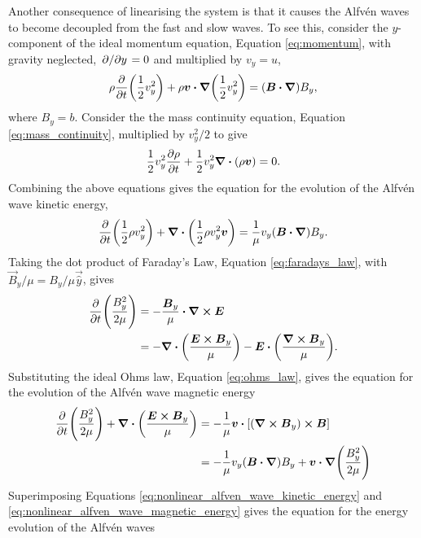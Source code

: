 Another consequence of linearising the system is that it causes the Alfv\'en waves to become decoupled from the fast and slow waves. To see this, consider the $y$-component of the ideal momentum equation, Equation \eqref{eq:momentum}, with gravity neglected, $\pdv*{}{y}=0$ and multiplied by $v_y=u$,
\begin{equation}
    \rho\pdv{}{t}\qty(\frac{1}{2}v_y^2)+\rho\vec{v}\vdot\grad\qty(\frac{1}{2}v_y^2)=(\vec{B}\vdot\grad)B_y,
\end{equation}
where $B_y=b$.
Consider the the mass continuity equation, Equation \eqref{eq:mass_continuity}, multiplied by $v_y^2/2$ to give 
\begin{equation}
    \frac{1}{2}v_y^2\pdv{\rho}{t}+\frac{1}{2}v_y^2\div(\rho\boldsymbol{v})=0.
\end{equation}
Combining the above equations gives the equation for the evolution of the Alfv\'en wave kinetic energy,
\begin{equation}
    \label{eq:nonlinear_alfven_wave_kinetic_energy}
    \pdv{}{t}\qty(\frac{1}{2}\rho v_y^2) + \div(\frac{1}{2}\rho v_y^2\vec{v})=\frac{1}{\mu}v_y(\vec{B}\vdot\grad)B_y.
\end{equation}
Taking the dot product of Faraday's Law, Equation \eqref{eq:faradays_law}, with $\vec{B}_y/\mu=B_y/\mu\vec{\hat{y}}$, gives
\begin{equation}
    \begin{aligned}
    \pdv{}{t}\qty(\frac{B_y^2}{2\mu})&=-\frac{\vec{B}_y}{\mu}\vdot\curl{\vec{E}} \\
    &=-\div(\frac{\vec{E}\cross\vec{B}_y}{\mu})-\vec{E}\vdot\qty(\frac{\curl{\vec{B}_y}}{\mu}).
    \end{aligned}
\end{equation}
Substituting the ideal Ohms law, Equation \eqref{eq:ohms_law}, gives the equation for the evolution of the Alfv\'en wave magnetic energy
\begin{equation}
    \label{eq:nonlinear_alfven_wave_magnetic_energy}
    \begin{aligned}
     \pdv{}{t}\qty(\frac{B_y^2}{2\mu}) + \div(\frac{\vec{E}\cross\vec{B}_y}{\mu}) &= -\frac{1}{\mu}\vec{v}\vdot[(\curl{\vec{B}_y})\cross\vec{B}] \\
     &=-\frac{1}{\mu}v_y(\vec{B}\vdot\grad)B_y + \vec{v}\vdot\grad\qty(\frac{B_y^2}{2\mu}) \\
    \end{aligned}
\end{equation}
Superimposing Equations \eqref{eq:nonlinear_alfven_wave_kinetic_energy} and \eqref{eq:nonlinear_alfven_wave_magnetic_energy} gives the equation for the energy evolution of the Alfv\'en waves
